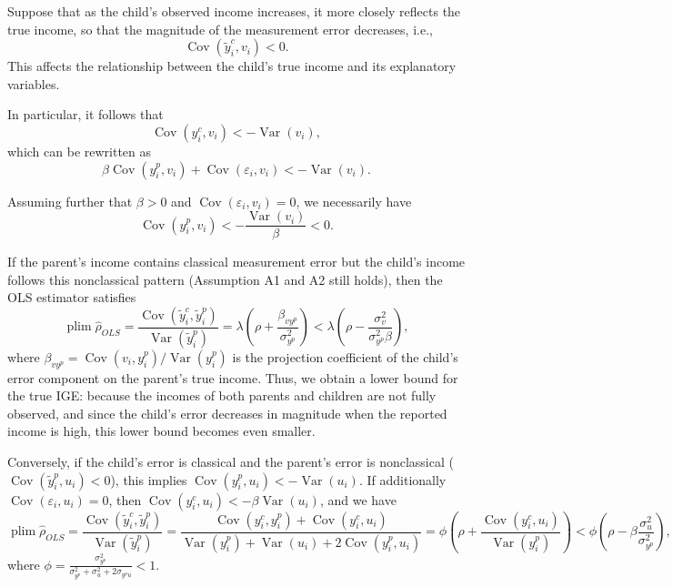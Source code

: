 \documentclass[12pt,oneside]{article}
\DeclareMathOperator*{\plim}{plim}
\theoremstyle{bracket}
\begin{document}
Suppose that as the child's observed income increases, it more closely reflects the true income, so that the magnitude of the measurement error decreases, i.e.,
\[
\operatorname{Cov}(\tilde{y}_i^c, v_i) < 0.
\]
This affects the relationship between the child's true income and its explanatory variables.

In particular, it follows that
\[
\operatorname{Cov}(y_i^c, v_i) < -\operatorname{Var}(v_i),
\]
which can be rewritten as
\[
\beta \operatorname{Cov}(y_i^p, v_i) + \operatorname{Cov}(\varepsilon_i, v_i) < -\operatorname{Var}(v_i).
\]

Assuming further that \(\beta > 0\) and \(\operatorname{Cov}(\varepsilon_i, v_i) = 0\), we necessarily have
\[
\operatorname{Cov}(y_i^p, v_i) < -\frac{\operatorname{Var}(v_i)}{\beta} < 0.
\]

If the parent's income contains classical measurement error but the child's income follows this nonclassical pattern (Assumption A1 and A2 still holds), then the OLS estimator satisfies
\[
\plim \hat{\rho}_{OLS} 
= \frac{\operatorname{Cov}(\tilde{y}_i^c,\tilde{y}_i^p)}{\operatorname{Var}(\tilde{y}_i^p)} 
= \lambda \left(\rho + \frac{\beta_{vy^p}}{\sigma^2_{y^p}} \right)
< \lambda \left(\rho - \frac{\sigma^2_v}{\sigma_{y^p}^2 \beta}\right),
\]
where \(\beta_{vy^p} = \operatorname{Cov}(v_i,y_i^p)/\operatorname{Var}(y_i^p)\) is the projection coefficient of the child's error component on the parent's true income.  
Thus, we obtain a lower bound for the true IGE: because the incomes of both parents and children are not fully observed, and since the child's error decreases in magnitude when the reported income is high, this lower bound becomes even smaller.

Conversely, if the child's error is classical and the parent's error is nonclassical (\(\operatorname{Cov}(\tilde{y}_i^p,u_i)<0\)), this implies \(\operatorname{Cov}(y_i^p,u_i)<-\operatorname{Var}(u_i)\).  
If additionally \(\operatorname{Cov}(\varepsilon_i,u_i)=0\), then \(\operatorname{Cov}(y_i^c,u_i) < -\beta \operatorname{Var}(u_i)\), and we have
\[
\plim \hat{\rho}_{OLS} 
= \frac{\operatorname{Cov}(\tilde{y}_i^c,\tilde{y}_i^p)}{\operatorname{Var}(\tilde{y}_i^p)} 
= \frac{\operatorname{Cov}(y_i^c,y_i^p)+\operatorname{Cov}(y_i^c,u_i)}{\operatorname{Var}(y_i^p)+\operatorname{Var}(u_i)+2\operatorname{Cov}(y_i^p,u_i)}
= \phi\left(\rho+\frac{\operatorname{Cov}(y_i^c,u_i)}{\operatorname{Var}(y_i^p)}\right)
< \phi \left(\rho-\beta \frac{\sigma^2_u}{\sigma^2_{y^p}}\right),
\]
where \(\phi = \frac{\sigma^2_{y^p}}{\sigma^2_{y^p} + \sigma^2_u + 2\sigma_{y^p u}} < 1\).
\end{document}
